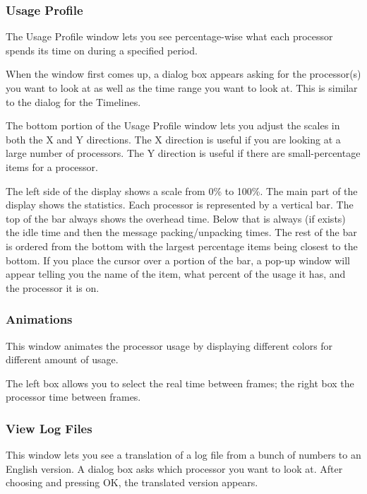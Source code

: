 \documentclass[10pt,dvips]{article}
\begin{document}
\begin{enumerate}
   \end{enumerate}

\subsubsection{Usage Profile}

   The Usage Profile window lets you see percentage-wise what each processor
   spends its time on during a specified period.

   When the window first comes up, a dialog box appears asking for the
   processor(s) you want to look at as well as the time range you want to look
   at.  This is similar to the dialog for the Timelines.

   The bottom portion of the Usage Profile window lets you adjust the scales in
   both the X and Y directions.  The X direction is useful if you are looking at
   a large number of processors.  The Y direction is useful if there are
   small-percentage items for a processor.

   The left side of the display shows a scale from 0\% to 100\%.  The main part of
   the display shows the statistics.  Each processor is represented by a
   vertical bar.  The top of the bar always shows the overhead time.  Below that
   is always (if exists) the idle time and then the message packing/unpacking
   times.  The rest of the bar is ordered from the bottom with the largest
   percentage items being closest to the bottom.  If you place the cursor over a
   portion of the bar, a pop-up window will appear telling you the name of the
   item, what percent of the usage it has, and the processor it is on.

\subsubsection{Animations}

   This window animates the processor usage by displaying
   different colors for different amount of usage.

   The left box allows you to select the real time between frames;
   the right box the processor time between frames.


\subsubsection{View Log Files}

   This window lets you see a translation of a log file from a bunch of numbers
   to an English version.  A dialog box asks which processor you want to look
   at.  After choosing and pressing OK, the translated version appears.
\end{document}
